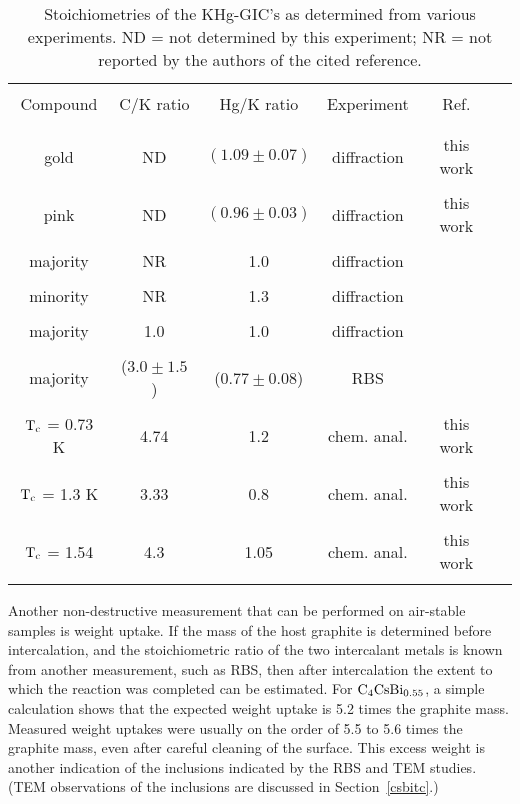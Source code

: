 \begin{table}
\caption[Stoichiometries of the KHg-GIC's as determined from various
experiments.]{Stoichiometries  of the KHg-GIC's  as determined from various
experiments.  ND = not determined by this experiment;  NR = not reported by
the authors of the cited reference.}
\label{stoichtab}
\begin{center}
\begin{tabular}{|c|ccccc|}
\hline
& & & & \\
Compound & C/K ratio & Hg/K ratio & Experiment & Ref.\\
& & & & \\
\hline
& & & & \\
gold  & ND & $(1.09 \pm 0.07)$ & diffraction  & this work\\
& & & & \\
pink  & ND & $(0.96 \pm 0.03)$ &  diffraction  & this work \\
& & & & \\
majority  & NR & 1.0 & diffraction  & \cite{yang84}\\
& & & & \\
minority  & NR & 1.3 &  diffraction  & \cite{yang84} \\
& & & & \\
majority  & 1.0 & 1.0 &  diffraction  & \cite{elmakrini80}\\
& & & & \\
majority  & ($3.0 \pm 1.5$) & ($0.77 \pm 0.08$) & RBS &  \cite{S175}\\
& & & & \\
$\rm T_c$ = 0.73 K  & 4.74 & 1.2 & chem. anal. & this work \\
& & & & \\
$\rm T_c$ = 1.3 K   & 3.33 & 0.8 & chem. anal. & this work\\
& & & & \\
$\rm T_c$ = 1.54  & 4.3 & 1.05 & chem. anal. & this work \\
& & & & \\
\hline
\end{tabular}
\end{center}
\end{table}

        Another  non-destructive  measurement that    can be   performed on
air-stable samples is weight uptake.   If the mass  of the host graphite is
determined before intercalation,  and the stoichiometric  ratio  of the two
intercalant  metals is known from another  measurement, such  as  RBS, then
after intercalation the extent to  which the reaction  was completed can be
estimated.  For $\rm C_4CsBi_{0.55}$,  a simple calculation  shows that the
expected weight uptake  is 5.2 times  the  graphite mass.   Measured weight
uptakes were usually  on the order  of 5.5 to 5.6  times the graphite mass,
even after careful cleaning of the  surface.  This excess weight is another
indication of the inclusions indicated  by the  RBS and TEM  studies.  (TEM
observations of the inclusions are discussed in Section~\ref{csbitc}.)

